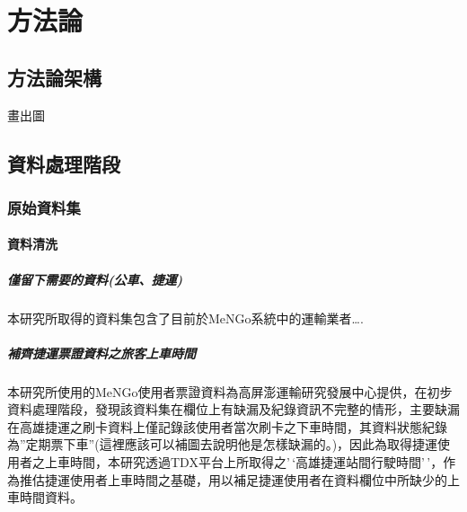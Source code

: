 
\providecommand{\tightlist}{%
  \setlength{\itemsep}{0pt}\setlength{\parskip}{0pt}
}

\chapter{方法論}\label{ux65b9ux6cd5ux8ad6}

\section{方法論架構}\label{ux65b9ux6cd5ux8ad6ux67b6ux69cb}

畫出圖

\section{資料處理階段}\label{ux8cc7ux6599ux8655ux7406ux968eux6bb5}

\subsection{原始資料集}\label{ux539fux59cbux8cc7ux6599ux96c6}

\subsubsection{資料清洗}\label{ux8cc7ux6599ux6e05ux6d17}

\paragraph{僅留下需要的資料(公車、捷運)}\label{ux50c5ux7559ux4e0bux9700ux8981ux7684ux8cc7ux6599ux516cux8ecaux6377ux904b}

本研究所取得的資料集包含了目前於MeNGo系統中的運輸業者\ldots.

\paragraph{補齊捷運票證資料之旅客上車時間}\label{ux88dcux9f4aux6377ux904bux7968ux8b49ux8cc7ux6599ux4e4bux65c5ux5ba2ux4e0aux8ecaux6642ux9593}

本研究所使用的MeNGo使用者票證資料為高屏澎運輸研究發展中心提供，在初步資料處理階段，發現該資料集在欄位上有缺漏及紀錄資訊不完整的情形，主要缺漏在高雄捷運之刷卡資料上僅記錄該使用者當次刷卡之下車時間，其資料狀態紀錄為''定期票下車''(這裡應該可以補圖去說明他是怎樣缺漏的。)，因此為取得捷運使用者之上車時間，本研究透過TDX平台上所取得之'\,`高雄捷運站間行駛時間'\,'，作為推估捷運使用者上車時間之基礎，用以補足捷運使用者在資料欄位中所缺少的上車時間資料。

